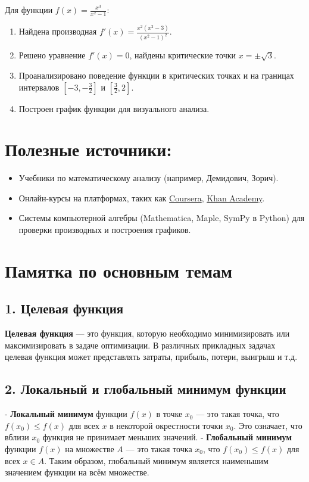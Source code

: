 \documentclass[a4paper,12pt]{article}
\begin{document}
Для функции \( f(x) = \frac{x^3}{x^2 - 1} \):
\begin{enumerate}
    \item Найдена производная \( f'(x) = \frac{x^2(x^2 - 3)}{(x^2 - 1)^2} \).
    \item Решено уравнение \( f'(x) = 0 \), найдены критические точки \( x = \pm \sqrt{3} \).
    \item Проанализировано поведение функции в критических точках и на границах интервалов \( \left[ -3, -\frac{3}{2} \right] \) и \( \left[ \frac{3}{2}, 2 \right] \).
    \item Построен график функции для визуального анализа.
\end{enumerate}

\section*{Полезные источники:}
\begin{itemize}
    \item Учебники по математическому анализу (например, Демидович, Зорич).
    \item Онлайн-курсы на платформах, таких как \href{https://www.coursera.org/}{Coursera}, \href{https://www.khanacademy.org/}{Khan Academy}.
    \item Системы компьютерной алгебры (Mathematica, Maple, SymPy в Python) для проверки производных и построения графиков.
\end{itemize}


\section*{Памятка по основным темам}

\subsection*{1. Целевая функция}
\textbf{Целевая функция} — это функция, которую необходимо минимизировать или максимизировать в задаче оптимизации. В различных прикладных задачах целевая функция может представлять затраты, прибыль, потери, выигрыш и т.д. 

\subsection*{2. Локальный и глобальный минимум функции}
- \textbf{Локальный минимум} функции \( f(x) \) в точке \( x_0 \) — это такая точка, что \( f(x_0) \leq f(x) \) для всех \( x \) в некоторой окрестности точки \( x_0 \). Это означает, что вблизи \( x_0 \) функция не принимает меньших значений.
- \textbf{Глобальный минимум} функции \( f(x) \) на множестве \( A \) — это такая точка \( x_0 \), что \( f(x_0) \leq f(x) \) для всех \( x \in A \). Таким образом, глобальный минимум является наименьшим значением функции на всём множестве.
\end{document}
